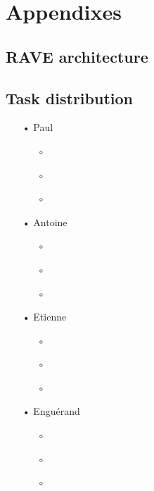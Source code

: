 \documentclass{article}
\begin{document}
\printbibliography
% 



\section{Appendixes}


\subsection{RAVE architecture}

\subsection{Task distribution}


\begin{itemize}
    \item[•] Paul
    \begin{itemize}
        \item[$\circ$] 
        \item[$\circ$] 
        \item[$\circ$] 
    \end{itemize}
    \item[•] Antoine
    \begin{itemize}
        \item[$\circ$] 
        \item[$\circ$] 
        \item[$\circ$] 
    \end{itemize}
    \item[•] Etienne
    \begin{itemize}
        \item[$\circ$] 
        \item[$\circ$] 
        \item[$\circ$] 
    \end{itemize}
    \item[•] Enguérand
    \begin{itemize}
        \item[$\circ$] 
        \item[$\circ$] 
        \item[$\circ$] 
    \end{itemize}



\end{itemize}

\end{document}
